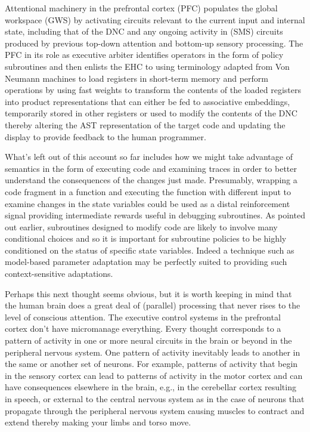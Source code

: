 Attentional machinery in the prefrontal cortex (PFC) populates the global workspace (GWS) by activating circuits relevant to the current input and internal state, including that of the DNC and any ongoing activity in (SMS) circuits produced by previous top-down attention and bottom-up sensory processing. The PFC in its role as executive arbiter identifies operators in the form of policy subroutines and then enlists the EHC to \emdash{} using terminology adapted from Von Neumann machines \emdash{} to load registers in short-term memory and perform operations by using fast weights to transform the contents of the loaded registers into product representations that can either be fed to associative embeddings, temporarily stored in other registers or used to modify the contents of the DNC thereby altering the AST representation of the target code and updating the display to provide feedback to the human programmer.

What's left out of this account so far includes how we might take advantage of semantics in the form of executing code and examining traces in order to better understand the consequences of the changes just made. Presumably, wrapping a code fragment in a function and executing the function with different input to examine changes in the state variables could be used as a distal reinforcement signal providing intermediate rewards useful in debugging subroutines. As pointed out earlier, subroutines designed to modify code are likely to involve many conditional choices and so it is important for subroutine policies to be highly conditioned on the status of specific state variables. Indeed a technique such as model-based parameter adaptation may be perfectly suited to providing such context-sensitive adaptations.

Perhaps this next thought seems obvious, but it is worth keeping in mind that the human brain does a great deal of (parallel) processing that never rises to the level of conscious attention. The executive control systems in the prefrontal cortex don't have micromanage everything. Every thought corresponds to a pattern of activity in one or more neural circuits in the brain or beyond in the peripheral nervous system. One pattern of activity inevitably leads to another in the same or another set of neurons. For example, patterns of activity that begin in the sensory cortex can lead to patterns of activity in the motor cortex and can have consequences elsewhere in the brain, e.g., in the cerebellar cortex resulting in speech, or external to the central nervous system as in the case of neurons that propagate through the peripheral nervous system causing muscles to contract and extend thereby making your limbs and torso move. 

